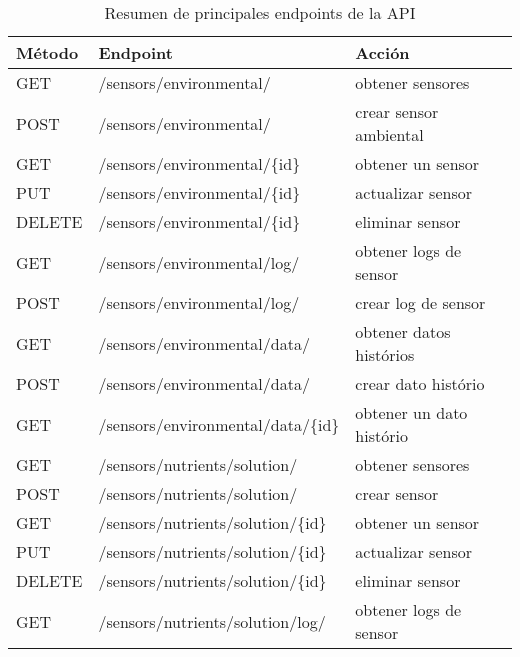 \begin{table}[H]
    \centering
    \caption[Resumen de principales endpoints de la API]{Resumen de principales endpoints de la API}
    \begin{tabular}{l l l}
        \toprule
        \textbf{Método} & \textbf{Endpoint}                     & \textbf{Acción}          \\
        \midrule
        GET             & /sensors/environmental/               & obtener sensores         \\
        POST            & /sensors/environmental/               & crear sensor ambiental   \\
        GET             & /sensors/environmental/\{id\}           & obtener un sensor        \\
        PUT             & /sensors/environmental/\{id\}           & actualizar sensor        \\
        DELETE          & /sensors/environmental/\{id\}           & eliminar sensor          \\
        \midrule
        GET             & /sensors/environmental/log/           & obtener logs de sensor   \\
        POST            & /sensors/environmental/log/           & crear log de sensor      \\
        \midrule
        GET             & /sensors/environmental/data/          & obtener datos histórios  \\
        POST            & /sensors/environmental/data/          & crear dato histório      \\
        GET             & /sensors/environmental/data/\{id\}      & obtener un dato histório \\
        \midrule
        GET             & /sensors/nutrients/solution/          & obtener sensores         \\
        POST            & /sensors/nutrients/solution/          & crear sensor             \\
        GET             & /sensors/nutrients/solution/\{id\}      & obtener un sensor        \\
        PUT             & /sensors/nutrients/solution/\{id\}      & actualizar sensor        \\
        DELETE          & /sensors/nutrients/solution/\{id\}      & eliminar sensor          \\
        \midrule
        GET             & /sensors/nutrients/solution/log/      & obtener logs de sensor   \\

\end{tabular}
\end{table}
